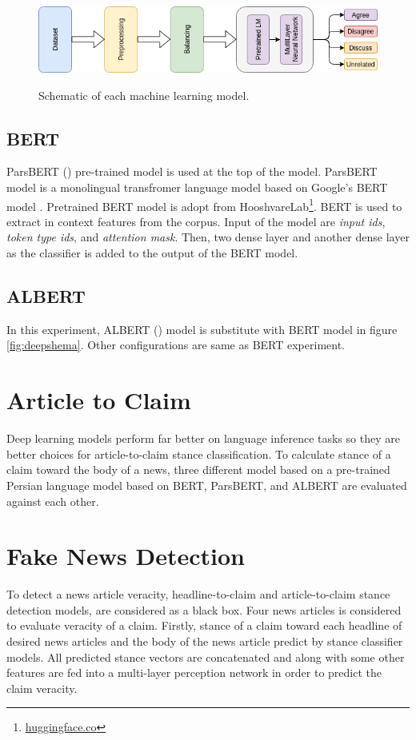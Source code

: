\begin{figure}%
	\centering
	{\includegraphics[width=14.5cm]{statistics/schema/dl.png} }
	\caption{Schematic of each machine learning model.}%
	\label{fig:dlschm}%
\end{figure}

\subsection{BERT}
ParsBERT (\cite{ParsBERT}) pre-trained model is used at the top of the model. ParsBERT model is a monolingual transfromer language model based on Google's BERT model \cite{bert}. Pretrained BERT model is adopt from HooshvareLab\footnote{\href{https://huggingface.co/HooshvareLab}{huggingface.co}}. BERT is used to extract in context features from the corpus. Input of the model are \textit{input ids}, \textit{token type ids}, and \textit{attention mask}. Then, two dense layer and another dense layer as the classifier is added to the output of the BERT model. 

\subsection{ALBERT}
In this experiment, ALBERT (\cite{albert})	 model is substitute with BERT model in figure \ref{fig:deepshema}.  Other configurations are same as BERT experiment.

\section{Article to Claim}
Deep learning models perform far better on language inference tasks so they are better choices for article-to-claim stance classification. To calculate stance of a claim toward the body of a news, three different model based on a pre-trained Persian language model based on BERT, ParsBERT, and  ALBERT are evaluated against each other. 

\section{Fake News Detection}
To detect a news article veracity, headline-to-claim and article-to-claim stance detection models, are considered as a black box. Four news articles is considered to evaluate veracity of a claim. Firstly, stance of a claim toward each headline of desired news articles and the body of the news article predict by stance classifier models. All predicted stance vectors are concatenated and along with some other features are fed into a multi-layer perception network in order to predict the claim veracity.

